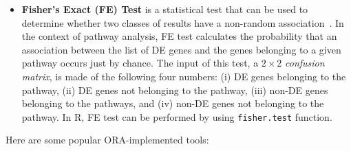 \begin{itemize}
\item \textbf{Fisher's Exact (FE) Test} is a statistical test that can be used to determine whether two  classes of results have a non-random association~\cite{Fisher:1951}.
In the context of pathway analysis,  FE test calculates the probability that an association between the list of DE genes and the genes belonging to a given pathway occurs just by chance.
The input of this test, a $2 \times 2$ \textit{confusion matrix}, is made of the following four numbers: (i) DE genes belonging to the pathway, (ii) DE genes not belonging to the pathway, (iii) non-DE genes belonging to the pathways, and (iv) non-DE genes not belonging to the pathway. 
In R, FE test can be performed by using \texttt{fisher.test} function.
\end{itemize}


Here are some popular ORA-implemented tools:

